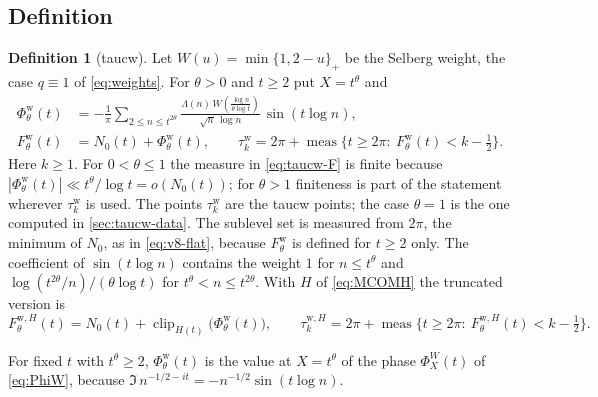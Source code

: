 \documentclass[11pt,a4paper]{article}
\numberwithin{equation}{section}
\theoremstyle{definition}
\newtheorem{definition}[theorem]{Definition}
\theoremstyle{remark}
\newcommand{\meas}{\operatorname{meas}}
\newcommand{\clip}{\operatorname{clip}}
\begin{document}
\subsection{Definition}\label{sec:taucw-def}
\begin{definition}[taucw]\label{def:taucw}
Let $W(u)=\min\{1,2-u\}_+$ be the Selberg weight, the case $q\equiv1$ of \eqref{eq:weights}. For $\theta>0$ and $t\ge2$ put $X=t^\theta$ and
\begin{align}
\Phi^{\mathrm w}_\theta(t)&=-\frac1\pi\sum_{2\le n\le t^{2\theta}}
\frac{\Lambda(n)\,W\!\left(\frac{\log n}{\theta\log t}\right)}{\sqrt n\,\log n}\,\sin(t\log n),\label{eq:taucw-phase}\\
F^{\mathrm w}_\theta(t)&=N_0(t)+\Phi^{\mathrm w}_\theta(t),\qquad
\tau_k^{\mathrm w}=2\pi+\meas\{t\ge2\pi:\ F^{\mathrm w}_\theta(t)<k-\tfrac12\}.\label{eq:taucw-F}
\end{align}
Here $k\ge1$. For $0<\theta\le1$ the measure in \eqref{eq:taucw-F} is finite because $|\Phi^{\mathrm w}_\theta(t)|\ll t^\theta/\log t=o(N_0(t))$; for $\theta>1$ finiteness is part of the statement wherever $\tau_k^{\mathrm w}$ is used. The points $\tau_k^{\mathrm w}$ are the taucw points; the case $\theta=1$ is the one computed in \cref{sec:taucw-data}. The sublevel set is measured from $2\pi$, the minimum of $N_0$, as in \eqref{eq:v8-flat}, because $F^{\mathrm w}_\theta$ is defined for $t\ge2$ only. The coefficient of $\sin(t\log n)$ contains the weight $1$ for $n\le t^\theta$ and $\log(t^{2\theta}/n)/(\theta\log t)$ for $t^\theta<n\le t^{2\theta}$. With $H$ of \eqref{eq:MCOMH} the truncated version is
\begin{equation}\label{eq:taucwH}
F^{\mathrm w,H}_\theta(t)=N_0(t)+\clip_{H(t)}\bigl(\Phi^{\mathrm w}_\theta(t)\bigr),\qquad
\tau_k^{\mathrm w,H}=2\pi+\meas\{t\ge2\pi:\ F^{\mathrm w,H}_\theta(t)<k-\tfrac12\}.
\end{equation}
\end{definition}
For fixed $t$ with $t^\theta\ge2$, $\Phi^{\mathrm w}_\theta(t)$ is the value at $X=t^\theta$ of the phase $\Phi_X^W(t)$ of \eqref{eq:PhiW}, because $\Im\,n^{-1/2-it}=-n^{-1/2}\sin(t\log n)$.
\end{document}
